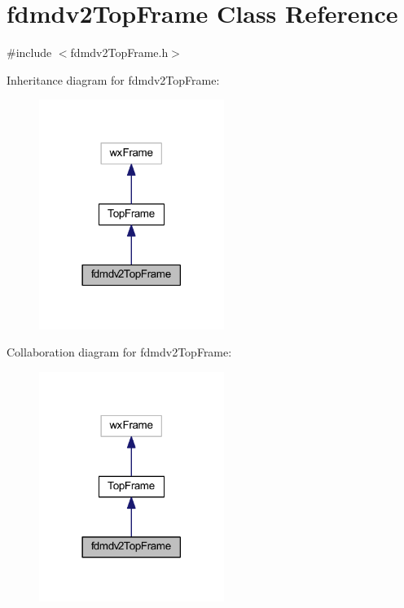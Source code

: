 \hypertarget{classfdmdv2_top_frame}{\section{fdmdv2\-Top\-Frame Class Reference}
\label{classfdmdv2_top_frame}
}


{\ttfamily \#include $<$fdmdv2\-Top\-Frame.\-h$>$}



Inheritance diagram for fdmdv2\-Top\-Frame\-:
\nopagebreak
\begin{figure}[H]
\begin{center}
\leavevmode
\includegraphics[width=170pt]{classfdmdv2_top_frame__inherit__graph}
\end{center}
\end{figure}


Collaboration diagram for fdmdv2\-Top\-Frame\-:
\nopagebreak
\begin{figure}[H]
\begin{center}
\leavevmode
\includegraphics[width=170pt]{classfdmdv2_top_frame__coll__graph}
\end{center}
\end{figure}
